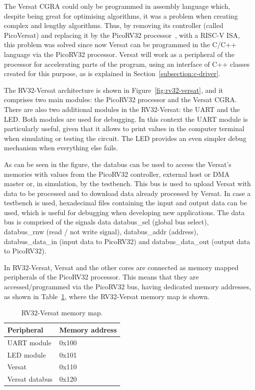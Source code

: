The Versat \ac{CGRA} could only be programmed
in assembly language which, despite being great for optimising algorithms, it
was a problem when creating complex and lengthy algorithms. Thus, by removing
its controller (called PicoVersat) and replacing it by the PicoRV32
processor~\cite{cliffordwolf:picorv32}, with a RISC-V \ac{ISA}, this problem was
solved since now Versat can be programmed in the C/C++ language via the PicoRV32
processor. Versat will work as a peripheral of the processor for accelerating
parts of the program, using an interface of C++ classes created for this
purpose, as is explained in Section~\ref{subsection:c-driver}.

The RV32-Versat architecture is shown in Figure~\ref{fig:rv32-versat}, and it
comprises two main modules: the PicoRV32 processor and the Versat \ac{CGRA}.
There are also two additional modules in the RV32-Versat: the \ac{UART} and the
\ac{LED}.  Both modules are used for debugging. In this context the \ac{UART}
module is particularly useful, given that it allows to print values in the
computer terminal when simulating or testing the circuit. The LED provides an
even simpler debug mechanism when everything else fails.


As can be seen in the figure, the databus can be used to access the Versat's
memories with values from the PicoRV32 controller, external host or \ac{DMA}
master or, in simulation, by the testbench. This bus is used to upload
Versat with data to be processed and to download data already processed by
Versat. In case a testbench is used, hexadecimal files containing the input and
output data can be used, which is useful for debugging when developing new
applications. The data bus is comprised of the signals data databus\_sel (global
bus select), databus\_rnw (read / not write signal), databus\_addr (address),
databus\_data\_in (input data to PicoRV32) and databus\_data\_out (output data to
PicoRV32).

In RV32-Versat, Versat and the other cores are connected as memory mapped
peripherals of the PicoRV32 processor. This means that they are
accessed/programmed via the PicoRV32 bus, having dedicated memory addresses, as
shown in Table~\ref{tab:mem_map}, where the RV32-Versat memory map is shown.

\begin{table}[!htbp]
	\renewcommand{\arraystretch}{1.2} %
	\caption{RV32-Versat memory map.}
	\label{tab:mem_map}
	\centering
	\begin{tabular}{ll}
		\toprule
		Peripheral     & Memory address\\
		\midrule
		\ac{UART} module    & 0x100\\
		\ac{LED} module     & 0x101\\
		Versat         & 0x110\\
		Versat databus & 0x120\\
		\bottomrule
	\end{tabular}
\end{table}

